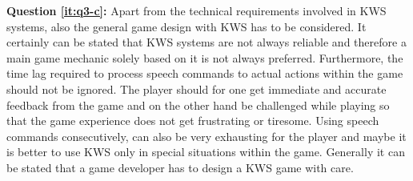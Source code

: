 \textbf{Question \ref{it:q3-c}:}
Apart from the technical requirements involved in KWS systems, also the general game design with KWS has to be considered.
It certainly can be stated that KWS systems are not always reliable and therefore a main game mechanic solely based on it is not always preferred.
Furthermore, the time lag required to process speech commands to actual actions within the game should not be ignored.
The player should for one get immediate and accurate feedback from the game and on the other hand be challenged while playing so that the game experience does not get frustrating or tiresome.
Using speech commands consecutively, can also be very exhausting for the player and maybe it is better to use KWS only in special situations within the game.
Generally it can be stated that a game developer has to design a KWS game with care.